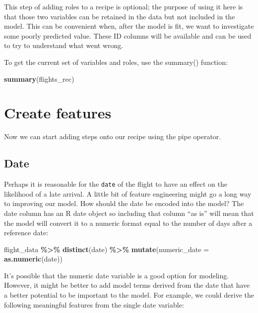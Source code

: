 \documentclass[
]{book}
\newenvironment{Shaded}{\begin{snugshade}}{\end{snugshade}}
\newcommand{\DataTypeTok}[1]{\textcolor[rgb]{0.13,0.29,0.53}{#1}}
\newcommand{\KeywordTok}[1]{\textcolor[rgb]{0.13,0.29,0.53}{\textbf{#1}}}
\newcommand{\NormalTok}[1]{#1}
\newcommand{\OperatorTok}[1]{\textcolor[rgb]{0.81,0.36,0.00}{\textbf{#1}}}
\newcommand{\StringTok}[1]{\textcolor[rgb]{0.31,0.60,0.02}{#1}}
\begin{document}
This step of adding roles to a recipe is optional; the purpose of using it here is that those two variables can be retained in the data but not included in the model. This can be convenient when, after the model is fit, we want to investigate some poorly predicted value. These ID columns will be available and can be used to try to understand what went wrong.

To get the current set of variables and roles, use the summary() function:

\begin{Shaded}
\begin{Highlighting}[]
\KeywordTok{summary}\NormalTok{(flights\_rec)}
\end{Highlighting}
\end{Shaded}

\hypertarget{create-features}{%
\section{Create features}\label{create-features}}

Now we can start adding steps onto our recipe using the pipe operator.

\hypertarget{date}{%
\subsection{Date}\label{date}}

Perhaps it is reasonable for the \texttt{date} of the flight to have an effect on the likelihood of a late arrival. A little bit of feature engineering might go a long way to improving our model. How should the date be encoded into the model? The date column has an R date object so including that column ``as is'' will mean that the model will convert it to a numeric format equal to the number of days after a reference date:

\begin{Shaded}
\begin{Highlighting}[]
\NormalTok{flight\_data }\OperatorTok{\%\textgreater{}\%}
\StringTok{  }\KeywordTok{distinct}\NormalTok{(date) }\OperatorTok{\%\textgreater{}\%}
\StringTok{  }\KeywordTok{mutate}\NormalTok{(}\DataTypeTok{numeric\_date =} \KeywordTok{as.numeric}\NormalTok{(date))}
\end{Highlighting}
\end{Shaded}

It's possible that the numeric date variable is a good option for modeling. However, it might be better to add model terms derived from the date that have a better potential to be important to the model. For example, we could derive the following meaningful features from the single date variable:
\end{document}
